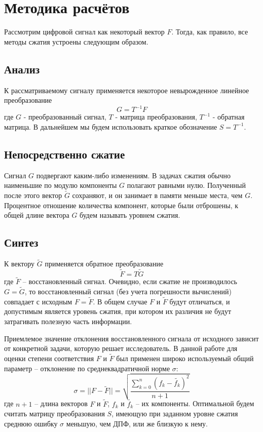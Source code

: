 \documentclass[11pt, oneside, a4paper]{article}
\begin{document}
\section{Методика расчётов}

Рассмотрим цифровой сигнал как некоторый вектор $F$. Тогда, как правило, все методы сжатия устроены следующим образом.

\subsection{Анализ} 

К рассматриваемому сигналу применяется некоторое невырожденное линейное преобразование
\begin{equation}
\label{directConverstion}
    G = T^{-1} F
\end{equation}
где $G$ - преобразованный сигнал, $T$ - матрица преобразования, $T^{-1}$ - обратная матрица. В дальнейшем мы будем использовать краткое обозначение $S = T^{-1}$.

\subsection{Непосредственно сжатие} 

Сигнал $G$ подвергают каким-либо изменениям. В задачах сжатия обычно наименьшие по модулю компоненты $G$ полагают равными нулю. Полученный после этого вектор $\tilde{G}$ сохраняют, и он занимает в памяти меньше места, чем $G$. Процентное отношение количества компонент, которые были отброшены, к общей длине вектора $G$ будем называть уровнем сжатия.

\subsection{Синтез} 

К вектору $\tilde{G}$ применяется обратное преобразование 
\begin{equation}
\label{inverseConverstion}
    \tilde{F} = T\tilde{G}
\end{equation}
где $\tilde{F}$ – восстановленный сигнал. Очевидно, если сжатие не производилось $G=\tilde{G}$, то восстановленный сигнал (без учета погрешности вычислений) совпадает с исходным $F=\tilde{F}$. В общем случае $F$ и $\tilde{F}$ будут отличаться, и допустимым является уровень сжатия, при котором их различия не будут затрагивать полезную часть информации.

Приемлемое значение отклонения восстановленного сигнала от исходного зависит от конкретной задачи, которую решает исследователь. В данной работе для оценки степени соответствия $F$ и $\tilde{F}$ был применен широко используемый общий параметр – отклонение по среднеквадратичной норме $\sigma$:
\begin{equation}
\label{squareNorm}
    \sigma = ||F-\tilde{F}||=\sqrt{\frac{\sum\limits_{k=0}^{n}(f_k-\tilde{f_k})^2}{n+1}}
\end{equation}
где $n+1$ – длина векторов $F$ и $\tilde{F}$, $f_k$ и $\tilde{f_k}$ – их компоненты. Оптимальной будем считать матрицу преобразования $S$, имеющую при заданном уровне сжатия среднюю ошибку $\sigma$ меньшую, чем ДПФ, или же близкую к нему.
\end{document}
